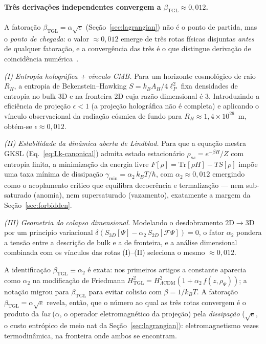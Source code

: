 \documentclass[12pt,a4paper]{article}
\newcommand{\betatgl}{\beta_{\text{TGL}}}
\begin{document}
\paragraph{Três derivações independentes convergem a $\betatgl \approx 0{,}012$.}
A fatoração $\betatgl = \alpha\sqrt{e}$ (Seção~\ref{sec:lagrangian}) não é o
ponto de partida, mas o \emph{ponto de chegada}: o valor $\approx 0{,}012$
emerge de três rotas físicas disjuntas \emph{antes} de qualquer fatoração,
e a convergência das três é o que distingue derivação de coincidência
numérica~\cite{MiguelAlpha2}.

\textit{(I) Entropia holográfica + vínculo CMB.} Para um horizonte cosmológico
de raio $R_H$, a entropia de Bekenstein--Hawking $S = k_B A_H/4\ell_P^2$ fixa
densidades de entropia no bulk 3D e na fronteira 2D cuja razão dimensional é
$3$.  Introduzindo a eficiência de projeção $\epsilon < 1$ (a projeção
holográfica não é completa) e aplicando o vínculo observacional da radiação
cósmica de fundo para $R_H \approx 1{,}4\times 10^{26}$~m, obtém-se
$\epsilon \approx 0{,}012$.

\textit{(II) Estabilidade da dinâmica aberta de Lindblad.} Para que a equação
mestra GKSL (Eq.~\ref{eq:Lk-canonical}) admita estado estacionário
$\rho_{ss} = e^{-\beta H}/Z$ com entropia finita, a minimização da energia
livre $F[\rho] = \mathrm{Tr}[\rho H] - TS[\rho]$ impõe uma taxa mínima de
dissipação $\gamma_{\min} = \alpha_2\, k_B T/\hbar$, com
$\alpha_2 \approx 0{,}012$ emergindo como o acoplamento crítico que equilibra
decoerência e termalização --- nem sub-saturado (anomia), nem supersaturado
(vazamento), exatamente a margem da Seção~\ref{sec:forbidden}.

\textit{(III) Geometria do colapso dimensional.} Modelando o desdobramento
$2\mathrm{D}\to 3\mathrm{D}$ por um princípio variacional
$\delta(S_{3D}[\Psi] - \alpha_2\, S_{2D}[\mathcal{F}\Psi]) = 0$, o fator
$\alpha_2$ pondera a tensão entre a descrição de bulk e a de fronteira, e a
análise dimensional combinada com os vínculos das rotas (I)--(II) seleciona o
mesmo $\approx 0{,}012$.

A identificação $\betatgl \equiv \alpha_2$ é exata: nos primeiros artigos a
constante aparecia como $\alpha_2$ na modificação de Friedmann
$H^2_{\text{TGL}} = H^2_{\Lambda\text{CDM}}(1 + \alpha_2\, f(z,\rho_\Psi))$;
a notação migrou para $\betatgl$ para evitar colisão com $\beta = 1/k_BT$.  A
fatoração $\betatgl = \alpha\sqrt{e}$ revela, então, que o número ao qual as
três rotas convergem é o produto da \emph{luz} ($\alpha$, o operador
eletromagnético da projeção) pela \emph{dissipação} ($\sqrt{e}$, o custo
entrópico de meio nat da Seção~\ref{sec:lagrangian}): eletromagnetismo vezes
termodinâmica, na fronteira onde ambos se encontram.
\end{document}

